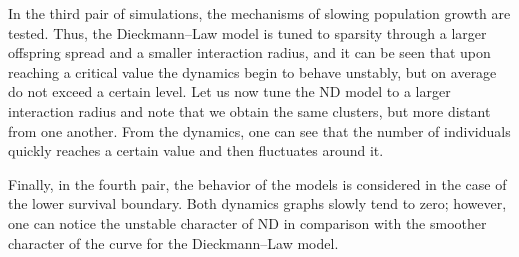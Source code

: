 \documentclass[12pt,a4paper]{article}
\begin{document}
In the third pair of simulations, the mechanisms of slowing population growth are tested. Thus, the Dieckmann--Law model is tuned to sparsity through a larger offspring spread and a smaller interaction radius, and it can be seen that upon reaching a critical value the dynamics begin to behave unstably, but on average do not exceed a certain level. Let us now tune the ND model to a larger interaction radius and note that we obtain the same clusters, but more distant from one another. From the dynamics, one can see that the number of individuals quickly reaches a certain value and then fluctuates around it.

Finally, in the fourth pair, the behavior of the models is considered in the case of the lower survival boundary. Both dynamics graphs slowly tend to zero; however, one can notice the unstable character of ND in comparison with the smoother character of the curve for the Dieckmann--Law model.
\end{document}
